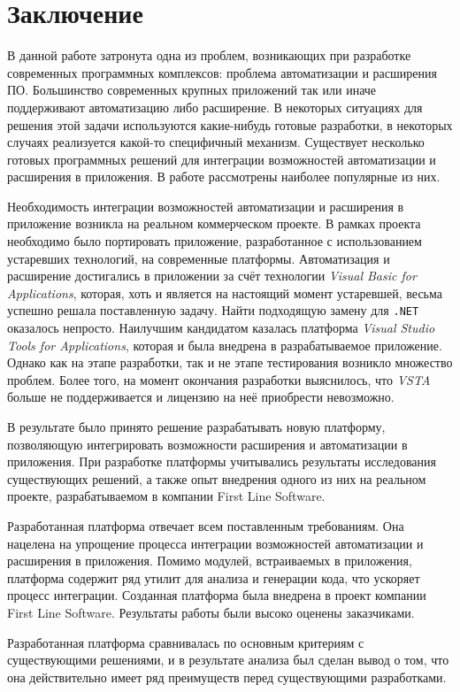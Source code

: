 



\setcounter{secnumdepth}{0}
\section{Заключение}
\setcounter{secnumdepth}{2}

В данной работе затронута одна из проблем, возникающих при разработке современных программных комплексов: проблема автоматизации и расширения ПО. Большинство современных крупных приложений так или иначе поддерживают автоматизацию либо расширение. В некоторых ситуациях для решения этой задачи используются какие-нибудь готовые разработки, в некоторых случаях реализуется какой-то специфичный механизм. Существует несколько готовых программных решений для интеграции возможностей автоматизации и расширения в приложения. В работе рассмотрены наиболее популярные из них. 

Необходимость интеграции возможностей автоматизации и расширения в приложение возникла на реальном коммерческом проекте. В рамках проекта необходимо было портировать приложение, разработанное с использованием устаревших технологий, на современные платформы. Автоматизация и расширение достигались в приложении за счёт технологии {\it Visual Basic for Applications}, которая, хоть и является на настоящий момент устаревшей, весьма успешно решала поставленную задачу. Найти подходящую замену для {\tt .NET} оказалось непросто. Наилучшим кандидатом казалась платформа {\it Visual Studio Tools for Applications}, которая и была внедрена в разрабатываемое приложение. Однако как на этапе разработки, так и не этапе тестирования возникло множество проблем. Более того, на момент окончания разработки выяснилось, что {\it VSTA} больше не поддерживается и лицензию на неё приобрести невозможно.

В результате было принято решение разрабатывать новую платформу, позволяющую интегрировать возможности расширения и автоматизации в приложения. При разработке платформы учитывались результаты исследования существующих решений, а также опыт внедрения одного из них на реальном проекте, разрабатываемом в компании First Line Software.

Разработанная платформа отвечает всем поставленным требованиям. Она нацелена на упрощение процесса интеграции возможностей автоматизации и расширения в приложения. Помимо модулей, встраиваемых в приложения, платформа содержит ряд утилит для анализа и генерации кода, что ускоряет процесс интеграции. Созданная платформа была внедрена в проект компании First Line Software. Результаты работы были высоко оценены заказчиками.

Разработанная платформа сравнивалась по основным критериям с существующими решениями, и в результате анализа был сделан вывод о том, что она действительно имеет ряд преимуществ перед существующими разработками.

\pagebreak